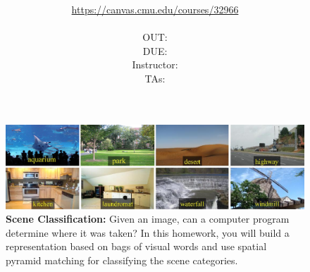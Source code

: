 \documentclass[11pt]{article}
\title{\textsc{\hwName}} %
\author{\courseName\\
\url{https://canvas.cmu.edu/courses/32966} \\
\\
OUT: \outDate{} \\
DUE: \dueDate{} \\ 
Instructor: \instructorName \\
TAs: \taNames}
\date{}
\date{}
\numberwithin{equation}{section} %
\numberwithin{figure}{section} %
\numberwithin{table}{section} %
\begin{document}
\maketitle

\begin{figure}[h]
\centering
\includegraphics[width=\textwidth]{figures/teaser/teaser.png}
\caption{{\bf Scene Classification:} Given an image, can a computer program determine where it was taken? In this homework, you will build a representation based on bags of visual words and use spatial pyramid matching for classifying the scene categories.}
\label{fig:teaser}
\end{figure}
\end{document}
